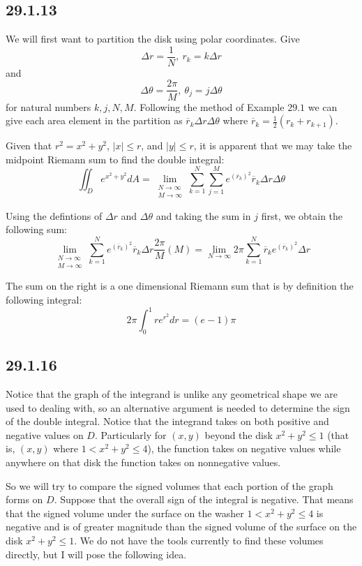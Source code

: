 \documentclass{article}
\begin{document}
\subsection{29.1.13}

We will first want to partition the disk using polar coordinates. Give $$\Delta r = \frac{1}{N}, ~ r_k = k\Delta r$$ and $$\Delta \theta = \frac{2\pi}{M}, ~ \theta_j = j\Delta \theta$$ for natural numbers $k,j,N,M$. Following the method of Example $\mathbf{29.1}$ we can give each area element in the partition as $\overline{r}_k\Delta r \Delta \theta$ where $\overline{r}_k = \frac{1}{2}(r_k+r_{k+1})$.

Given that $r^2 = x^2 + y^2$, $|x|\leq r$, and $|y|\leq r$, it is apparent that we may take the midpoint Riemann sum to find the double integral:
$$\iint_D e^{x^2+y^2}dA = \lim_{\substack{N\to \infty\\M\to \infty}} \sum_{k=1}^{N}\sum_{j=1}^{M} e^{(\overline{r}_k)^2} \overline{r}_k\Delta r \Delta \theta$$

Using the defintions of $\Delta r$ and $\Delta \theta$ and taking the sum in $j$ first, we obtain the following sum:
$$\lim_{\substack{N\to \infty\\M\to \infty}} \sum_{k=1}^{N} e^{(\overline{r}_k)^2} \overline{r}_k\Delta r \frac{2\pi}{M}(M) = \lim_{N\to \infty} 2\pi \sum_{k=1}^{N}  \overline{r}_k e^{(\overline{r}_k)^2}\Delta r$$

The sum on the right is a one dimensional Riemann sum that is by definition the following integral:
$$2\pi \int_0^1 re^{r^2}dr = (e-1)\pi$$

\subsection{29.1.16}

Notice that the graph of the integrand is unlike any geometrical shape we are used to dealing with, so an alternative argument is needed to determine the sign of the double integral. Notice that the integrand takes on both positive and negative values on $D$. Particularly for $(x,y)$ beyond the disk $x^2+y^2 \leq 1$ (that is, $(x,y)$ where $1 < x^2+y^2 \leq 4$), the function takes on negative values while anywhere on that disk the function takes on nonnegative values.

So we will try to compare the signed volumes that each portion of the graph forms on $D$. Suppose that the overall sign of the integral is negative. That means that the signed volume under the surface on the washer $1 < x^2+y^2 \leq 4$ is negative and is of greater magnitude than the signed volume of the surface on the disk $x^2+y^2 \leq 1$. We do not have the tools currently to find these volumes directly, but I will pose the following idea. 
\end{document}
